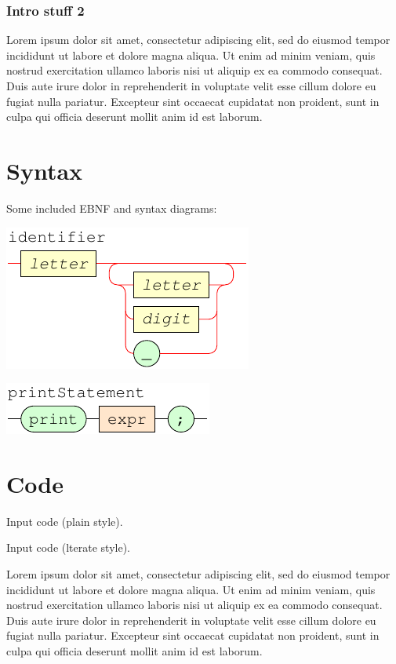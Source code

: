 \documentclass[a4paper]{article}
\begin{document}
\subsubsection{Intro stuff 2}

Lorem ipsum dolor sit amet, consectetur adipiscing elit, sed do eiusmod
tempor incididunt ut labore et dolore magna aliqua. Ut enim ad minim
veniam, quis nostrud exercitation ullamco laboris nisi ut aliquip ex ea
commodo consequat. Duis aute irure dolor in reprehenderit in voluptate
velit esse cillum dolore eu fugiat nulla pariatur. Excepteur sint occaecat
cupidatat non proident, sunt in culpa qui officia deserunt mollit anim id
est laborum.

\section{Syntax}

Some included EBNF and syntax diagrams:


{\centering

   \includegraphics[scale=0.9]{syntax/identifier}

}


{\centering

   \includegraphics[scale=0.9]{syntax/printStatement}

}

\section{Code}

Input code (plain style).


\noindent Input code (lterate style).



Lorem ipsum dolor sit amet, consectetur adipiscing elit, sed do eiusmod
tempor incididunt ut labore et dolore magna aliqua. Ut enim ad minim
veniam, quis nostrud exercitation ullamco laboris nisi ut aliquip ex ea
commodo consequat. Duis aute irure dolor in reprehenderit in voluptate
velit esse cillum dolore eu fugiat nulla pariatur. Excepteur sint occaecat
cupidatat non proident, sunt in culpa qui officia deserunt mollit anim id
est laborum.


\end{document}
